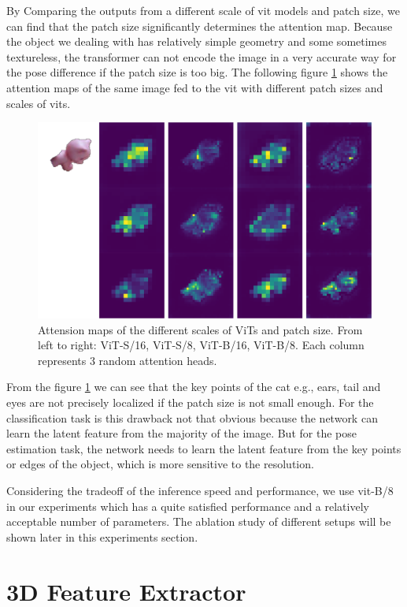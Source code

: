 \documentclass[12pt,DIV14,BCOR12mm,a4paper,footinclude=false,headinclude,parskip=half-,twoside,openright,cleardoublepage=empty,toc=index,bibliography=totoc,listof=totoc]{scrreprt}
\numberwithin{equation}{chapter}
\begin{document}
By Comparing the outputs from a different scale of \gls{vit} models and patch size, we can find that the patch size significantly determines the attention map. Because the object we dealing with has relatively simple geometry and some sometimes textureless, the transformer can not encode the image in a very accurate way for the pose difference if the patch size is too big. The following figure \ref{img:atten_patch} shows the attention maps of the same image fed to the \gls{vit} with different patch sizes and scales of \glspl{vit}. 
\begin{figure}[h]
	\centering
	\includegraphics[width=1.\textwidth]{img/atten_cat.png}
	\caption{Attension maps of the different scales of ViTs and patch size. From left to right: ViT-S/16, ViT-S/8, ViT-B/16, ViT-B/8. Each column represents 3 random attention heads.}
	\label{img:atten_patch}
\end{figure}

From the figure \ref{img:atten_patch} we can see that the key points of the cat e.g., ears, tail and eyes are not precisely localized if the patch size is not small enough. For the classification task is this drawback not that obvious because the network can learn the latent feature from the majority of the image. But for the pose estimation task, the network needs to learn the latent feature from the key points or edges of the object, which is more sensitive to the resolution.

Considering the tradeoff of the inference speed and performance, we use \gls{vit}-B/8 in our experiments which has a quite satisfied performance and a relatively acceptable number of parameters. The ablation study of different setups will be shown later in this experiments section.

\section{3D Feature Extractor}
\end{document}
